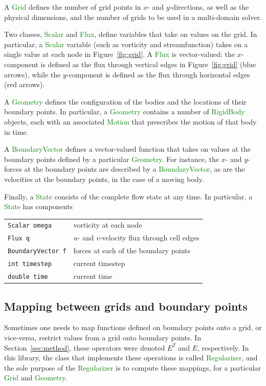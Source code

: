 \documentclass[11pt]{article}
\def\class#1{\textcolor{green}{\bf #1}}
\def\class#1{\textcolor{green}{\ttfamily\small #1}} %
\begin{document}
A \class{Grid} defines the number of grid points in $x$- and $y$-directions, as well as the physical dimensions, and the number of grids to be used in a multi-domain solver.

Two classes, \class{Scalar} and \class{Flux}, define variables that take on values on the grid.  In particular, a \class{Scalar} variable (such as vorticity and streamfunction) takes on a single value at each node in Figure~\ref{fig:grid}. A \class{Flux} is vector-valued: the $x$-component is defined as the flux through vertical edges in Figure~\ref{fig:grid} (blue arrows), while the $y$-component is defined as the flux through horizontal edges (red arrows).

A \class{Geometry} defines the configuration of the bodies and the locations of their boundary points.  In particular, a \class{Geometry} contains a number of \class{RigidBody} objects, each with an associated \class{Motion} that prescribes the motion of that body in time.

A \class{BoundaryVector} defines a vector-valued function that takes on values at the boundary points defined by a particular \class{Geometry}.  For instance, the $x$- and $y$-forces at the boundary points are described by a \class{BoundaryVector}, as are the velocities at the boundary points, in the case of a moving body.

Finally, a \class{State} consists of the complete flow state at any time.  In particular, a \class{State} has components
\begin{center}
	\begin{tabular}{ll}
		\verb|Scalar omega|     & vorticity at each node\\
		\verb|Flux q|           & $u$- and $v$-velocity flux through cell edges\\
		\verb|BoundaryVector f| & forces at each of the boundary points\\
		\verb|int timestep|     & current timestep\\
		\verb|double time|      & current time
	\end{tabular}
\end{center}

\subsection{Mapping between grids and boundary points}
\label{sub:regularizer}
Sometimes one needs to map functions defined on boundary points onto a grid, or vice-versa, restrict values from a grid onto boundary points.  In Section~\ref{sec:method}, these operators were denoted $E^T$ and $E$, respectively.  In this library, the class that implements these operations is called \class{Regularizer}, and the sole purpose of the \class{Regularizer} is to compute these mappings, for a particular \class{Grid} and \class{Geometry}.
\end{document}
